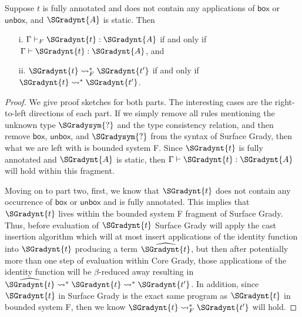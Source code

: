 \begin{lemma}
  \label{lemma:F-inclusion}
  Suppose $t$ is fully annotated and does not contain any applications
  of $ \mathsf{box} $ or $ \mathsf{unbox} $, and $\SGradynt{A}$ is static.  Then
  \begin{itemize}
  \item[i.] $ \Gamma  \vdash_F  \SGradynt{t}  :  \SGradynt{A} $ if and only if $\, \Gamma  \vdash  \SGradynt{t}  :  \SGradynt{A} $, and 
  \item[ii.] $ \SGradynt{t}  \rightsquigarrow^*_F  \SGradynt{t'} $ if and only if $ \SGradynt{t}  \rightsquigarrow^*  \SGradynt{t'} $.
  \end{itemize}
\end{lemma}
\begin{proof}
  We give proof sketches for both parts.  The interesting cases are
  the right-to-left directions of each part.  If we simply remove all
  rules mentioning the unknown type $\SGradysym{\mbox{?}}$ and the type consistency
  relation, and then remove $ \mathsf{box} $, $ \mathsf{unbox} $, and $\SGradysym{\mbox{?}}$ from
  the syntax of Surface Grady, then what we are left with is bounded
  system F.  Since $\SGradynt{t}$ is fully annotated and $\SGradynt{A}$ is static,
  then $ \Gamma  \vdash  \SGradynt{t}  :  \SGradynt{A} $ will hold within this fragment.

  Moving on to part two, first, we know that $\SGradynt{t}$ does not contain
  any occurrence of $ \mathsf{box} $ or $ \mathsf{unbox} $ and is fully annotated.
  This implies that $\SGradynt{t}$ lives within the bounded system F fragment
  of Surface Grady. Thus, before evaluation of $\SGradynt{t}$ Surface Grady
  will apply the cast insertion algorithm which will at most insert
  applications of the identity function into $\SGradynt{t}$ producing a term
  $\widehat{\SGradynt{t}}$, but then after potentially more than one step of
  evaluation within Core Grady, those applications of the identity
  function will be $\beta$-reduced away resulting in $\widehat{\SGradynt{t}}
  \rightsquigarrow^* \SGradynt{t} \rightsquigarrow^* \SGradynt{t'}$.  In addition,
  since $\SGradynt{t}$ in Surface Grady is the exact same program as $\SGradynt{t}$
  in bounded system F, then we know $ \SGradynt{t}  \rightsquigarrow^*_F  \SGradynt{t'} $ will hold.
\end{proof}

